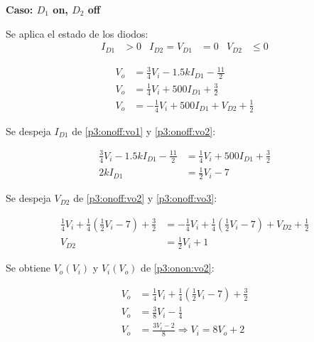%
%
%

\bigskip

\textbf{Caso: $D_1$ on, $D_2$ off}

Se aplica el estado de los diodos:
\begin{align*}
  I_{D1} &> 0
  &
  I_{D2} = V_{D1} &= 0
  &
  V_{D2} &\leq 0
\end{align*}

\begin{align}
  V_o &=
    \frac{3}{4} V_i
    - 1.5k I_{D1}
    - \frac{11}{2} \label{p3:onoff:vo1}
  \\
  V_o &=
    \frac{1}{4} V_i
    + 500 I_{D1}
    + \frac{3}{2} \label{p3:onoff:vo2}
  \\
  V_o &=
    - \frac{1}{4} V_i
    + 500 I_{D1}
    + V_{D2}
    + \frac{1}{2} \label{p3:onoff:vo3}
\end{align}

Se despeja $I_{D1}$ de \ref{p3:onoff:vo1} y \ref{p3:onoff:vo2}:

\begin{align*}
  \frac{3}{4} V_i - 1.5k I_{D1} - \frac{11}{2} &=
  \frac{1}{4} V_i + 500 I_{D1}  + \frac{3}{2}
  \\
  2k I_{D1} &= \frac{1}{2} V_i - 7
\end{align*}

Se despeja $V_{D2}$ de \ref{p3:onoff:vo2} y \ref{p3:onoff:vo3}:

\begin{align*}
  \frac{1}{4} V_i   + \frac{1}{4} \left( \frac{1}{2} V_i - 7 \right) + \frac{3}{2} &=
  - \frac{1}{4} V_i + \frac{1}{4} \left( \frac{1}{2} V_i - 7 \right) + V_{D2} + \frac{1}{2}
  \\
  V_{D2} &= \frac{1}{2} V_i + 1
\end{align*}

Se obtiene $V_o(V_i)$ y $V_i(V_o)$ de \ref{p3:onon:vo2}:

\begin{align*}
  V_o &=
    \frac{1}{4} V_i
    + \frac{1}{4} \left( \frac{1}{2} V_i - 7 \right)
    + \frac{3}{2}
  \\
  V_o &= \frac{3}{8} V_i - \frac{1}{4}
  \\
  V_o &= \frac{3 V_i - 2}{8} \Rightarrow V_i = 8 V_o + 2
\end{align*}

